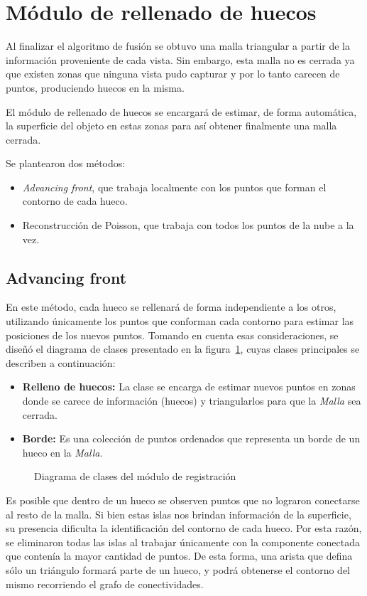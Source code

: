 \section{Módulo de rellenado de huecos}
	Al finalizar el algoritmo de fusión se obtuvo una malla triangular a partir
	de la información proveniente de cada vista.
	Sin embargo, esta malla no es cerrada ya que existen zonas que ninguna
	vista pudo capturar y por lo tanto carecen de puntos, produciendo huecos en la misma.

	El módulo de rellenado de huecos se encargará de estimar, de forma automática, la superficie del
	objeto en estas zonas para así obtener finalmente una malla cerrada.

	Se plantearon dos métodos:
	\begin{itemize}
		\item \emph{Advancing front}, que trabaja localmente con los puntos que forman el contorno de cada hueco.
		\item Reconstrucción de Poisson, que trabaja con todos los puntos de la nube a la vez. 
	\end{itemize}


	\subsection{Advancing front}
		En este método, cada hueco se rellenará de forma independiente a los otros,
		utilizando únicamente los puntos que conforman cada contorno para estimar
		las posiciones de los nuevos puntos.
		Tomando en cuenta esas consideraciones, se diseñó el diagrama de clases presentado en la figura~\ref{fig:filling_class},
		cuyas clases principales se describen a continuación:
		\begin{itemize}
			\item {\bfseries Relleno de huecos:} La clase se encarga de estimar
				nuevos puntos en zonas donde se carece de información (huecos)
				y triangularlos para que la \emph{Malla} sea cerrada.
			\item {\bfseries Borde:} Es una colección de puntos ordenados
				que representa un borde de un hueco en la \emph{Malla}.
		\end{itemize}

		\begin{figure}
			\caption{\label{fig:filling_class}Diagrama de clases del módulo de registración}
		\end{figure}

		Es posible que dentro de un hueco se observen puntos que no lograron
		conectarse al resto de la malla.  Si bien estas islas nos brindan
		información de la superficie, su presencia dificulta la identificación
		del contorno de cada hueco.  Por esta razón, se eliminaron todas las
		islas al trabajar únicamente con la componente conectada que contenía
		la mayor cantidad de puntos.
		De esta forma, una arista que defina sólo un triángulo formará parte de un hueco,
		y podrá obtenerse el contorno del mismo recorriendo el grafo de conectividades. 

